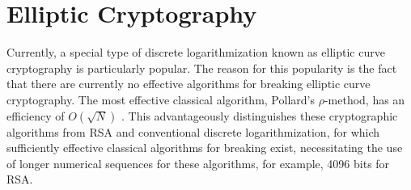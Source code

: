 \chapter{Elliptic Cryptography}
Currently, a special type of discrete logarithmization known as elliptic curve cryptography is particularly popular. The reason for this popularity is the fact that there are currently no effective algorithms for breaking elliptic curve cryptography. The most effective classical algorithm, Pollard's $\rho$-method, has an efficiency of $O\left(\sqrt{N}\right)$ \cite{Pollard}. This advantageously distinguishes these cryptographic algorithms from RSA and conventional discrete logarithmization, for which sufficiently effective classical algorithms for breaking exist, necessitating the use of longer numerical sequences for these algorithms, for example, 4096 bits for RSA.




